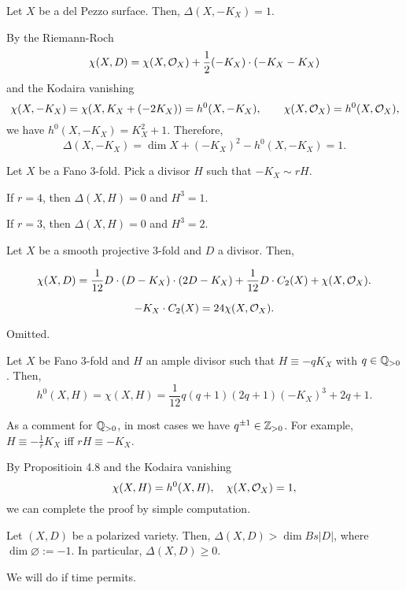 \documentclass{../../small}
\begin{document}
\begin{ex}
Let $X$ be a del Pezzo surface.
Then, $\Delta(X,-K_X)=1$.
\end{ex}
\begin{pf}
By the Riemann-Roch
\[\chi(X,D)=\chi(X,\mathcal{O}_X)+\frac12(-K_X)\cdot(-K_X-K_X)\]
and the Kodaira vanishing
\[\chi(X,-K_X)=\chi(X,K_X+(-2K_X))=h^0(X,-K_X),\qquad\chi(X,\mathcal{O}_X)=h^0(X,\mathcal{O}_X),\]
we have $h^0(X,-K_X)=K_X^2+1$.
Therefore,
\[\Delta(X,-K_X)=\dim X+(-K_X)^2-h^0(X,-K_X)=1.\]
\end{pf}

\begin{prop}
Let $X$ be a Fano 3-fold.
Pick a divisor $H$ such that $-K_X\sim rH$.
\begin{parts}
\item If $r=4$, then $\Delta(X,H)=0$ and $H^3=1$.
\item If $r=3$, then $\Delta(X,H)=0$ and $H^3=2$.
\end{parts}
\end{prop}
\begin{prop}
Let $X$ be a smooth projective 3-fold and $D$ a divisor.
Then,
\begin{parts}
\item \[\chi(X,D)=\frac1{12}D\cdot(D-K_X)\cdot(2D-K_X)+\frac1{12}D\cdot C_2(X)+\chi(X,\mathcal{O}_X).\]
\item \[-K_X\cdot C_2(X)=24\chi(X,\mathcal{O}_X).\]
\end{parts}
\end{prop}
\begin{pf}
Omitted.
\end{pf}
\begin{cor}
Let $X$ be Fano 3-fold and $H$ an ample divisor such that $H\equiv -qK_X$ with $q\in\mathbb{Q}_{>0}$.
Then,
\[h^0(X,H)=\chi(X,H)=\frac1{12}q(q+1)(2q+1)(-K_X)^3+2q+1.\]
\end{cor}
As a comment for $\mathbb{Q}_{>0}$, in most cases we have $q^{\pm1}\in\mathbb{Z}_{>0}$.
For example, $H\equiv-\frac1rK_X$ iff $rH\equiv-K_X$.
\begin{pf}
By Propositioin 4.8 and the Kodaira vanishing
\[\chi(X,H)=h^0(X,H),\quad\chi(X,\mathcal{O}_X)=1,\]
we can complete the proof by simple computation.
\end{pf}
\begin{thm}
Let $(X,D)$ be a polarized variety.
Then, $\Delta(X,D)>\dim Bs|D|$, where $\dim\varnothing:=-1$.
In particular, $\Delta(X,D)\ge0$.
\end{thm}
\begin{pf}
We will do if time permits.
\end{pf}
\end{document}

